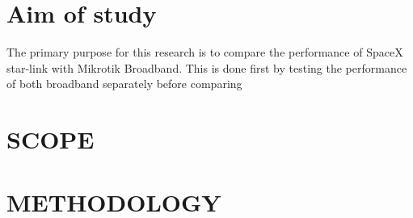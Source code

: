 \section{Aim of study}
The primary purpose for this research is to compare the performance of SpaceX star-link with Mikrotik Broadband. This is done first by testing the performance of both broadband separately before comparing
\section{SCOPE}

\section{METHODOLOGY}

